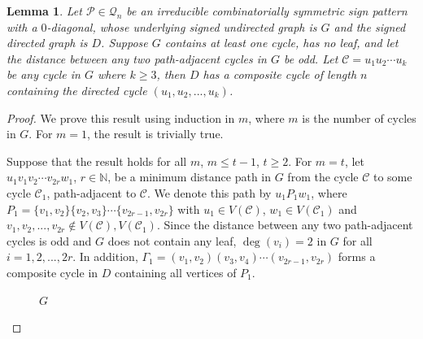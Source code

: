 \documentclass[a4paper, 10pt]{article}
\newtheorem{lemma}{Lemma}[section]
\numberwithin{equation}{section}
\begin{document}
\begin{lemma}\label{nl111}
	Let $\mathcal{P}\in \mathcal{Q}_n$ be an irreducible combinatorially symmetric sign pattern with a $0$-diagonal, whose underlying signed undirected graph is $G$ and the signed directed graph is $D$. Suppose $G$ contains at least one cycle, has no leaf, and let the distance between any two path-adjacent cycles in $G$ be odd. Let $\mathcal{C}=u_1u_2\cdots u_k$ be any cycle in $G$ where $k\geq 3$, then $D$ has a composite cycle of length $n$ containing the directed cycle $(u_1,u_2,...,u_k)$.
\end{lemma}
\begin{proof}
	We prove this result using induction in $m$, where $m$ is the number of cycles in $G$. For $m=1$, the result is trivially true.
	
	Suppose that the result holds for all $m$, $m \leq t-1$, $t\geq 2$. For $m=t$, let $u_1v_1v_2\cdots v_{2r}w_1$, $r\in \mathbb{N}$, be a minimum distance path in $G$ from the cycle $\mathcal{C}$ to some cycle $\mathcal{C}_1$, path-adjacent to $\mathcal{C}$. We denote this path by $u_1P_1w_1$, where $P_1=\{v_1,v_2\}\{v_2,v_3\}\cdots \{v_{2r-1},v_{2r}\}$ with $u_1\in V(\mathcal{C})$, $w_1\in V(\mathcal{C}_1)$ and $v_1,v_2,...,v_{2r}\notin V(\mathcal{C}),V(\mathcal{C}_1)$. Since the distance between any two path-adjacent cycles is odd and $G$ does not contain any leaf, $\deg(v_i)=2$ in $G$ for all $i=1,2,...,2r$. In addition, $\Gamma_1=(v_1,v_2)(v_3,v_4)\cdots(v_{2r-1},v_{2r})$ forms a composite cycle in $D$ containing all vertices of $P_1$.
	
	\begin{figure}[H]
		\tikzset{node distance=1cm}
		\centering
		\caption{$G$}
	\end{figure}
	

\end{proof}
\end{document}

